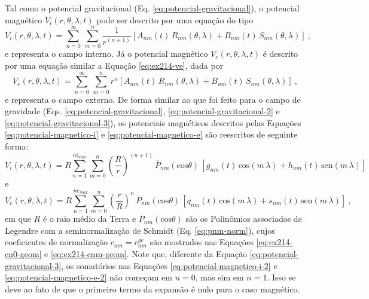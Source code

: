 \documentclass[10pt,a4paper,fleqn]{article}
\begin{document}
Tal como o potencial gravitacional (Eq. \ref{eq:potencial-gravitacional}),
o potencial magn\'{e}tico $V_{i}(r, \theta, \lambda, t)$ pode ser descrito
por uma equa\c{c}\~{a}o do tipo
\begin{equation}
V_{i}(r, \theta, \lambda, t) = \sum_{n=0}^{\infty} \, \sum_{m=0}^{n} 
\frac{1}{r^{(n+1)}} \left[ 
A_{nm}(t) \, R_{nm}(\theta, \lambda) +
B_{nm}(t) \, S_{nm}(\theta, \lambda)
\right] \: ,
\label{eq:potencial-magnetico-i}
\end{equation}
e representa o campo interno.
Já o potencial magn\'{e}tico $V_{e}(r, \theta, \lambda, t)$ \'{e} descrito
por uma equa\c{c}\~{a}o similar a Equa\c{c}\~{a}o \ref{eq:ex214-ve},
dada por
\begin{equation}
V_{e}(r, \theta, \lambda, t) = \sum_{n=0}^{\infty} \, \sum_{m=0}^{n} 
r^{n} \left[ 
A_{nm}(t) \, R_{nm}(\theta, \lambda) +
B_{nm}(t) \, S_{nm}(\theta, \lambda)
\right] \: ,
\label{eq:potencial-magnetico-e}
\end{equation}
e representa o campo externo.
De forma similar ao que foi feito para o campo de gravidade (Eqs. 
\ref{eq:potencial-gravitacional}, \ref{eq:potencial-gravitacional-2} e
\ref{eq:potencial-gravitacional-3}), os potenciais magn\'{e}ticos
descritos pelas Equa\c{c}\~{o}es \ref{eq:potencial-magnetico-i} e
\ref{eq:potencial-magnetico-e} s\~{a}o reescritos de seguinte forma:
\begin{equation}
V_{i}(r, \theta, \lambda, t) = R 
\sum_{n=1}^{ni_{max}} \sum_{m=0}^{n} 
\left(\frac{R}{r}\right)^{(n+1)} \, \overline{P}_{nm}(\text{cos}\theta) \, \left[ 
g_{nm}(t) \, \text{cos}(m \, \lambda) +
h_{nm}(t) \, \text{sen}(m \, \lambda)
\right]
\label{eq:potencial-magnetico-i-2}
\end{equation}
e
\begin{equation}
V_{e}(r, \theta, \lambda, t) = R 
\sum_{n=1}^{ne_{max}} \sum_{m=0}^{n} 
\left(\frac{r}{R}\right)^{n} \, \overline{P}_{nm}(\text{cos}\theta) \, \left[ 
q_{nm}(t) \, \text{cos}(m \, \lambda) +
s_{nm}(t) \, \text{sen}(m \, \lambda)
\right] \: ,
\label{eq:potencial-magnetico-e-2}
\end{equation}
em que $R$ \'{e} o raio m\'{e}dio da Terra e
$\overline{P}_{nm}(\text{cos}\theta)$ s\~{a}o os Polin\^{o}mios 
associados de Legendre com a 
seminormaliza\c{c}\~{a}o de Schmidt (Eq. \ref{eq:pnm-norm}), cujos
coeficientes de normaliza\c{c}\~{a}o $c_{nm} = c_{nm}^{ge}$ s\~{a}o 
mostrados nas Equa\c{c}\~{o}es \ref{eq:ex214-cn0-geom} e \ref{eq:ex214-cnm-geom}.
Note que, diferente da Equa\c{c}\~{a}o \ref{eq:potencial-gravitacional-3},
os somat\'{o}rios nas Equa\c{c}\~{o}es \ref{eq:potencial-magnetico-i-2}
e \ref{eq:potencial-magnetico-e-2}
n\~{a}o come\c{c}am em $n = 0$, mas sim em $n = 1$. Isso se deve
ao fato de que o primeiro termo da expans\~{a}o \'{e} nulo
para o caso magn\'{e}tico.
\end{document}
